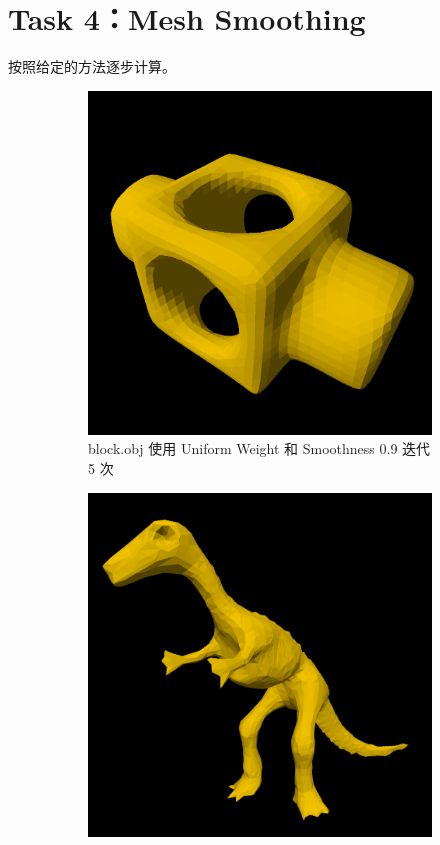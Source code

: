 \documentclass[UTF8]{ctexart}
\begin{document}
\section*{Task 4：Mesh Smoothing}

按照给定的方法逐步计算。

\begin{figure}[h]
    \begin{subfigure}[b]{0.48\textwidth}
        \centering
        \includegraphics[height=0.3\textheight]{images/4-1.png}
        \caption{block.obj 使用 Uniform Weight 和 Smoothness 0.9 迭代 5 次}
    \end{subfigure}
    \hfill
    \begin{subfigure}[b]{0.48\textwidth}
        \centering
        \includegraphics[height=0.3\textheight]{images/4-2.png}

\end{subfigure}
\end{figure}
\end{document}
